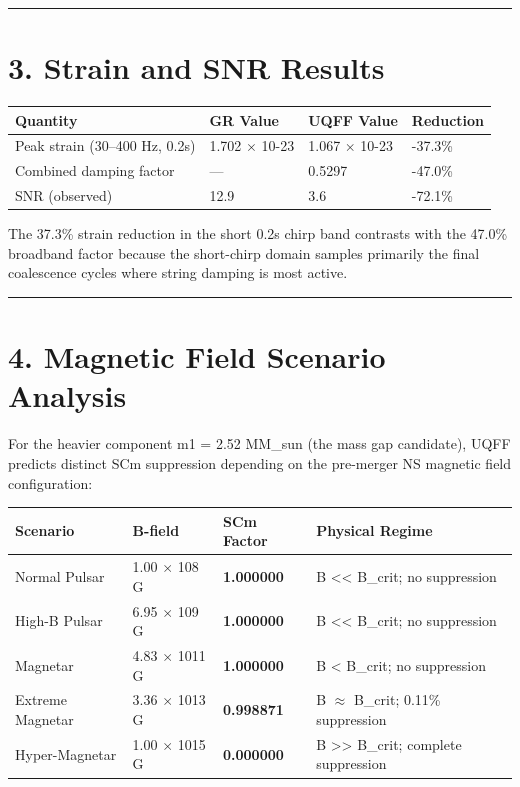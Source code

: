 \documentclass[11pt]{article}
\begin{document}
\noindent\rule{\textwidth}{0.4pt}

\section*{3. Strain and SNR Results}

\begin{center}
\begin{longtable}{llll}
\toprule
Quantity & GR Value & UQFF Value & Reduction \tabularnewline
\midrule
\endhead
Peak strain (30--400 Hz, 0.2s) & 1.702 $\times$ 10-23 & 1.067 $\times$ 10-23 & -37.3\% \tabularnewline
Combined damping factor & --- & 0.5297 & -47.0\% \tabularnewline
SNR (observed) & 12.9 & 3.6 & -72.1\% \tabularnewline
\bottomrule
\end{longtable}
\end{center}

The 37.3\% strain reduction in the short 0.2s chirp band contrasts with the 47.0\% broadband factor because the short-chirp domain samples primarily the final coalescence cycles where string damping is most active.

\noindent\rule{\textwidth}{0.4pt}

\section*{4. Magnetic Field Scenario Analysis}

For the heavier component m1 = 2.52 MM\_sun (the mass gap candidate), UQFF predicts distinct SCm suppression depending on the pre-merger NS magnetic field configuration:

\begin{center}
\begin{longtable}{llll}
\toprule
Scenario & B-field & SCm Factor & Physical Regime \tabularnewline
\midrule
\endhead
Normal Pulsar & 1.00 $\times$ 108 G & \textbf{1.000000} & B << B\_crit; no suppression \tabularnewline
High-B Pulsar & 6.95 $\times$ 109 G & \textbf{1.000000} & B << B\_crit; no suppression \tabularnewline
Magnetar & 4.83 $\times$ 1011 G & \textbf{1.000000} & B < B\_crit; no suppression \tabularnewline
Extreme Magnetar & 3.36 $\times$ 1013 G & \textbf{0.998871} & B $\approx$ B\_crit; 0.11\% suppression \tabularnewline
Hyper-Magnetar & 1.00 $\times$ 1015 G & \textbf{0.000000} & B >> B\_crit; complete suppression \tabularnewline
\bottomrule
\end{longtable}
\end{center}
\end{document}
